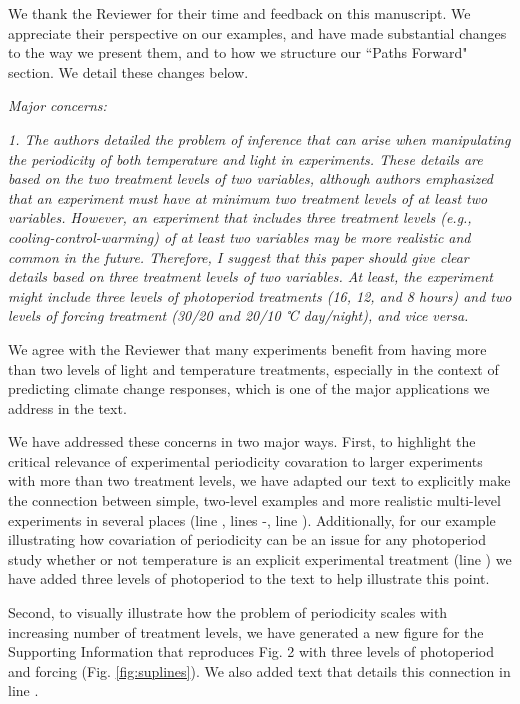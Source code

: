 \documentclass[11pt]{article}
\begin{document}
We thank the Reviewer for their time and feedback on this manuscript. We appreciate their perspective on our examples, and have made substantial changes to the way we present them, and to how we structure our ``Paths Forward" section. We detail these changes below.

\emph{Major concerns:}

\emph{1. The authors detailed the problem of inference that can arise when manipulating the periodicity of both temperature and light in experiments. These details are based on the two treatment levels of two variables, although authors emphasized that an experiment must have at minimum two treatment levels of at least two variables. However, an experiment that includes three treatment levels (e.g., cooling-control-warming) of at least two variables may be more realistic and common in the future. Therefore, I suggest that this paper should give clear details based on three treatment levels of two variables. At least, the experiment might include three levels of photoperiod treatments (16, 12, and 8 hours) and two levels of forcing treatment (30/20 and 20/10 ℃ day/night), and vice versa.}

We agree with the Reviewer that many experiments benefit from having more than two levels of light and temperature treatments, especially in the context of predicting climate change responses, which is one of the major applications we address in the text.

We have addressed these concerns in two major ways. First, to highlight the critical relevance of experimental periodicity covaration to larger experiments with more than two treatment levels, we have adapted our text to explicitly make the connection between simple, two-level examples and more realistic multi-level experiments in several places (line , lines -, line ). Additionally, for our example illustrating how covariation of periodicity can be an issue for any photoperiod study whether or not temperature is an explicit experimental treatment (line ) we have added three levels of photoperiod to the text to help illustrate this point. 

Second, to visually illustrate how the problem of periodicity scales with increasing number of treatment levels, we have generated a new figure for the Supporting Information that reproduces Fig. 2 with three levels of photoperiod and forcing (Fig. \ref{fig:suplines}). We also added text that details this connection in line .
\end{document}
